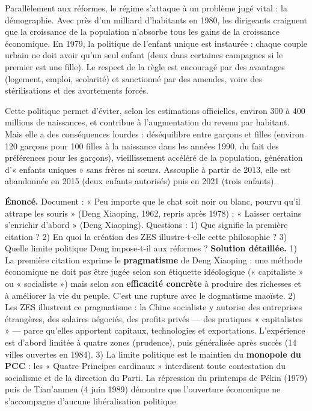 \documentclass[11pt]{article}
\newcommand{\cle}[1]{{\popxbold\color{popdark}#1}}
\newcounter{popsec}
\newcounter{popsub}
\newcommand{\courssub}[1]{%
  \stepcounter{popsub}%
  \par\vspace{9pt}\noindent{\popxbold\fontsize{11.5}{13}\selectfont\color{popink}{\color{poporange}\thepopsec.\thepopsub}\hspace{6pt}#1}\par\nopagebreak\vspace{4pt}
}
\begin{document}
\courssub{La politique de l'enfant unique (1979)}

Parallèlement aux réformes, le régime s'attaque à un problème jugé vital : la démographie. Avec près d'un milliard d'habitants en 1980, les dirigeants craignent que la croissance de la population n'absorbe tous les gains de la croissance économique. En \cle{1979}, la \cle{politique de l'enfant unique} est instaurée : chaque couple urbain ne doit avoir qu'un seul enfant (deux dans certaines campagnes si le premier est une fille). Le respect de la règle est encouragé par des avantages (logement, emploi, scolarité) et sanctionné par des amendes, voire des stérilisations et des avortements forcés.

Cette politique permet d'éviter, selon les estimations officielles, environ 300 à 400 millions de naissances, et contribue à l'augmentation du revenu par habitant. Mais elle a des conséquences lourdes : déséquilibre entre garçons et filles (environ 120 garçons pour 100 filles à la naissance dans les années 1990, du fait des préférences pour les garçons), vieillissement accéléré de la population, génération d'« enfants uniques » sans frères ni sœurs. Assouplie à partir de 2013, elle est abandonnée en 2015 (deux enfants autorisés) puis en 2021 (trois enfants).

\begin{exoresolu}
\textbf{Énoncé.} Document : « Peu importe que le chat soit noir ou blanc, pourvu qu'il attrape les souris » (Deng Xiaoping, 1962, repris après 1978) ; « Laisser certains s'enrichir d'abord » (Deng Xiaoping). Questions : 1) Que signifie la première citation ? 2) En quoi la création des ZES illustre-t-elle cette philosophie ? 3) Quelle limite politique Deng impose-t-il aux réformes ?
\tcblower
\textbf{Solution détaillée.}
1) La première citation exprime le \textbf{pragmatisme} de Deng Xiaoping : une méthode économique ne doit pas être jugée selon son étiquette idéologique (« capitaliste » ou « socialiste ») mais selon son \textbf{efficacité concrète} à produire des richesses et à améliorer la vie du peuple. C'est une rupture avec le dogmatisme maoïste.
2) Les ZES illustrent ce pragmatisme : la Chine socialiste y autorise des entreprises étrangères, des salaires négociés, des profits privés — des pratiques « capitalistes » — parce qu'elles apportent capitaux, technologies et exportations. L'expérience est d'abord limitée à quatre zones (prudence), puis généralisée après succès (14 villes ouvertes en 1984).
3) La limite politique est le maintien du \textbf{monopole du PCC} : les « Quatre Principes cardinaux » interdisent toute contestation du socialisme et de la direction du Parti. La répression du printemps de Pékin (1979) puis de Tian'anmen (4 juin 1989) démontre que l'ouverture économique ne s'accompagne d'aucune libéralisation politique.
\end{exoresolu}
\end{document}
